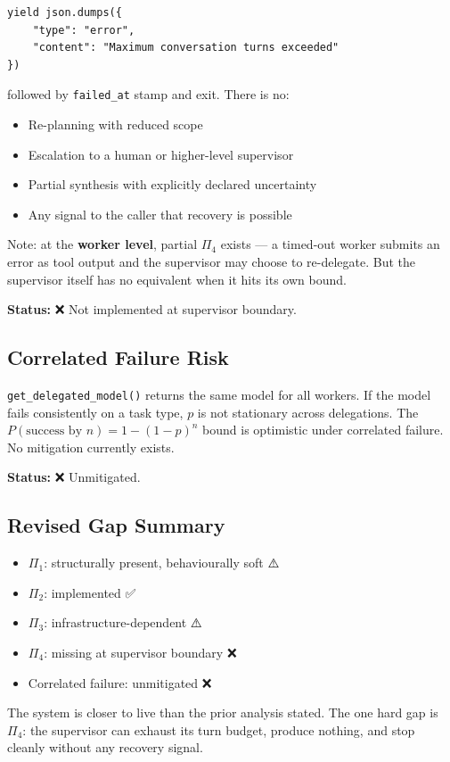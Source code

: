\begin{verbatim}
yield json.dumps({
    "type": "error",
    "content": "Maximum conversation turns exceeded"
})
\end{verbatim}

followed by \texttt{failed\_at} stamp and exit. There is no:

\begin{itemize}
  \item Re-planning with reduced scope
  \item Escalation to a human or higher-level supervisor
  \item Partial synthesis with explicitly declared uncertainty
  \item Any signal to the caller that recovery is possible
\end{itemize}

Note: at the \textbf{worker level}, partial $\Pi_4$ exists — a timed-out worker
submits an error as tool output and the supervisor may choose to re-delegate.
But the supervisor itself has no equivalent when it hits its own bound.

\textbf{Status:} ❌ Not implemented at supervisor boundary.

\subsection*{Correlated Failure Risk}

\texttt{get\_delegated\_model()} returns the same model for all workers.
If the model fails consistently on a task type, $p$ is not stationary across
delegations. The $P(\text{success by } n) = 1 - (1-p)^n$ bound is optimistic
under correlated failure. No mitigation currently exists.

\textbf{Status:} ❌ Unmitigated.

\subsection*{Revised Gap Summary}

\begin{itemize}
  \item $\Pi_1$: structurally present, behaviourally soft ⚠️
  \item $\Pi_2$: implemented ✅
  \item $\Pi_3$: infrastructure-dependent ⚠️
  \item $\Pi_4$: missing at supervisor boundary ❌
  \item Correlated failure: unmitigated ❌
\end{itemize}

The system is closer to live than the prior analysis stated.
The one hard gap is $\Pi_4$: the supervisor can exhaust its turn budget,
produce nothing, and stop cleanly without any recovery signal.